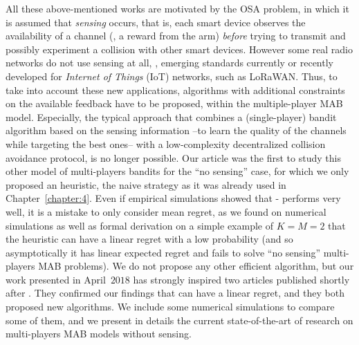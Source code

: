 All these above-mentioned works are motivated by the OSA problem, in which it is assumed that \emph{sensing} occurs, that is, each smart device observes the availability of a channel (\ie, a reward from the arm) \emph{before} trying to transmit and possibly experiment a collision with other smart devices.
However some real radio networks do not use sensing at all, \eg, emerging standards currently or recently developed for \emph{Internet of Things} (IoT) networks, such as LoRaWAN.
Thus, to take into account these new applications, algorithms with additional constraints on the available feedback have to be proposed, within the multiple-player MAB model.
Especially, the typical approach that combines a (single-player) bandit algorithm based on the sensing information --to learn the quality of the channels while targeting the best ones-- with a low-complexity decentralized collision avoidance protocol, is no longer possible.
%
Our article \cite{Besson2018ALT} was the first to study this other model of multi-players bandits for the ``no sensing'' case,
for which we only proposed an heuristic, the naive \Selfish{} strategy as it was already used in Chapter~\ref{chapter:4}.
Even if empirical simulations showed that \Selfish-\klUCB{} performs very well, it is a mistake to only consider mean regret, as we found on numerical simulations as well as formal derivation on a simple example of $K=M=2$ that the \Selfish{} heuristic can have a linear regret with a low probability (and so asymptotically it has linear expected regret and fails to solve ``no sensing'' multi-players MAB problems).
We do not propose any other efficient algorithm, but our work presented in April~$2018$ has strongly inspired two articles published shortly after \cite{LugosiMehrabian18,BoursierPerchet18}.
They confirmed our findings that \Selfish{} can have a linear regret, and they both proposed new algorithms.
We include some numerical simulations to compare some of them, and we present in details the current state-of-the-art of research on multi-players MAB models without sensing.


